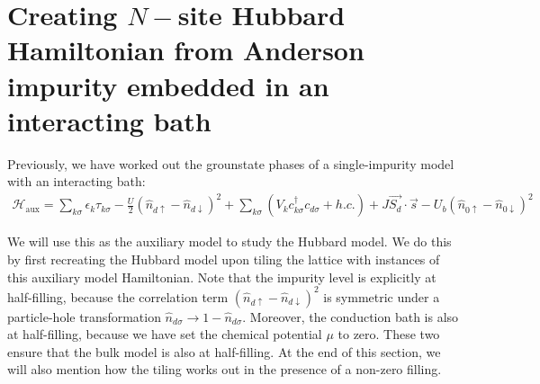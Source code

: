 \documentclass{report}
\numberwithin{equation}{section}
\begin{document}
\section{Creating \(N-\)site Hubbard Hamiltonian from Anderson impurity embedded in an interacting bath}

Previously, we have worked out the grounstate phases of a single-impurity model with an interacting bath:
\begin{equation}\begin{aligned}
	\label{siam_attr}
	\mathcal{H}_\text{aux} = \sum_{k\sigma}\epsilon_k \tau_{k\sigma} - \frac{U}{2}\left(\hat n_{d \uparrow} - \hat n_{d \downarrow} \right) ^2 + \sum_{k\sigma} \left(V_{k} c^\dagger_{k\sigma} c_{d\sigma} + h.c.\right) +J \vec{S_d}\cdot\vec{s} - U_b\left(\hat n_{0 \uparrow} - \hat n_{0 \downarrow}\right)^2 
\end{aligned}\end{equation}
 
We will use this as the auxiliary model to study the Hubbard model. We do this by first recreating the Hubbard model upon tiling the lattice with instances of this auxiliary model Hamiltonian. Note that the impurity level is explicitly at half-filling, because the correlation term \(\left( \hat n_{d \uparrow} - \hat n_{d \downarrow} \right) ^2\) is symmetric under a particle-hole transformation \(\hat n_{d\sigma} \to 1 - \hat n_{d\sigma}\). Moreover, the conduction bath is also at half-filling, because we have set the chemical potential \(\mu\) to zero. These two ensure that the bulk model is also at half-filling. At the end of this section, we will also mention how the tiling works out in the presence of a non-zero filling.
\end{document}
